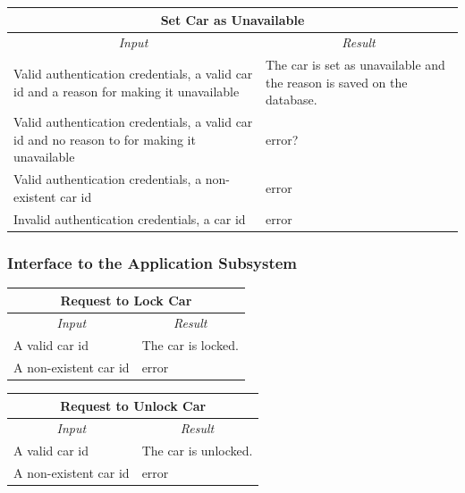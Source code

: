 \documentclass[english]{article}
\begin{document}
\begin{center}

	\begin{tabular}{ | p{6cm} | p{6cm} | }
		\hline 
		\multicolumn{2}{|c|}{\textbf{Set Car as Unavailable}} \\
		\hline
		\multicolumn{1}{|c|}{\textit{Input}} & \multicolumn{1}{c|}{\textit{Result}} \\
		\hline
		Valid authentication credentials, a valid car id and a reason for making it unavailable & The car is set as unavailable and the reason is saved on the database. \\
		\hline
		Valid authentication credentials, a valid car id and no reason to for making it unavailable & error? \\ %
		\hline
		Valid authentication credentials, a non-existent car id & error \\
		\hline
		Invalid authentication credentials, a car id  & error \\
		\hline
	\end{tabular}
\end{center}

\subsubsection{Interface to the Application Subsystem}
\begin{center}

	\begin{tabular}{ | p{6cm} | p{6cm} | }
		\hline
		\multicolumn{2}{|c|}{\textbf{Request to Lock Car}} \\
		\hline
		\multicolumn{1}{|c|}{\textit{Input}} & \multicolumn{1}{c|}{\textit{Result}} \\
		\hline
		A valid car id & The car is locked. \\
		\hline
		A non-existent car id  & error \\
		\hline
	\end{tabular}
\end{center}

\begin{center}

	\begin{tabular}{ | p{6cm} | p{6cm} | }
		\hline 
		\multicolumn{2}{|c|}{\textbf{Request to Unlock Car}} \\
		\hline
		\multicolumn{1}{|c|}{\textit{Input}} & \multicolumn{1}{c|}{\textit{Result}} \\
		\hline
		A valid car id & The car is unlocked. \\
		\hline
		A non-existent car id & error \\
		\hline
	\end{tabular}
\end{center}
\end{document}
